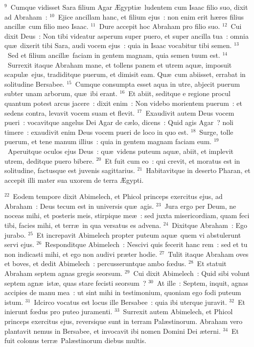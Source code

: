 ${}^{9}$~Cumque vidisset Sara filium Agar \AE gypti\ae\ ludentem cum Isaac filio suo, dixit ad Abraham~:
${}^{10}$~Ejice ancillam hanc, et filium ejus~: non enim erit h\ae res filius ancill\ae\ cum filio meo Isaac.
${}^{11}$~Dure accepit hoc Abraham pro filio suo.
${}^{12}$~Cui dixit Deus~: Non tibi videatur asperum super puero, et super ancilla tua~: omnia qu\ae\ dixerit tibi Sara, audi vocem ejus~: quia in Isaac vocabitur tibi semen.
${}^{13}$~Sed et filium ancill\ae\ faciam in gentem magnam, quia semen tuum est.
${}^{14}$~Surrexit itaque Abraham mane, et tollens panem et utrem aqu\ae , imposuit scapul\ae\ ejus, tradiditque puerum, et dimisit eam. Qu\ae\ cum abiisset, errabat in solitudine Bersabee.
${}^{15}$~Cumque consumpta esset aqua in utre, abjecit puerum subter unam arborum, qu\ae\ ibi erant.
${}^{16}$~Et abiit, seditque e regione procul quantum potest arcus jacere~: dixit enim~: Non videbo morientem puerum~: et sedens contra, levavit vocem suam et flevit.
${}^{17}$~Exaudivit autem Deus vocem pueri~: vocavitque angelus Dei Agar de c\ae lo, dicens~: Quid agis Agar~? noli timere~: exaudivit enim Deus vocem pueri de loco in quo est.
${}^{18}$~Surge, tolle puerum, et tene manum illius~: quia in gentem magnam faciam eum.
${}^{19}$~Aperuitque oculos ejus Deus~: qu\ae\ videns puteum aqu\ae , abiit, et implevit utrem, deditque puero bibere.
${}^{20}$~Et fuit cum eo~: qui crevit, et moratus est in solitudine, factusque est juvenis sagittarius.
${}^{21}$~Habitavitque in deserto Pharan, et accepit illi mater sua uxorem de terra \AE gypti.


${}^{22}$~Eodem tempore dixit Abimelech, et Phicol princeps exercitus ejus, ad Abraham~: Deus tecum est in universis qu\ae\ agis.
${}^{23}$~Jura ergo per Deum, ne noceas mihi, et posteris meis, stirpique me\ae~: sed juxta misericordiam, quam feci tibi, facies mihi, et terr\ae\ in qua versatus es advena.
${}^{24}$~Dixitque Abraham~: Ego jurabo.
${}^{25}$~Et increpavit Abimelech propter puteum aqu\ae\ quem vi abstulerunt servi ejus.
${}^{26}$~Responditque Abimelech~: Nescivi quis fecerit hanc rem~: sed et tu non indicasti mihi, et ego non audivi pr\ae ter hodie.
${}^{27}$~Tulit itaque Abraham oves et boves, et dedit Abimelech~: percusseruntque ambo fœdus.
${}^{28}$~Et statuit Abraham septem agnas gregis seorsum.
${}^{29}$~Cui dixit Abimelech~: Quid sibi volunt septem agn\ae\ ist\ae , quas stare fecisti seorsum~?
${}^{30}$~At ille~: Septem, inquit, agnas accipies de manu mea~: ut sint mihi in testimonium, quoniam ego fodi puteum istum.
${}^{31}$~Idcirco vocatus est locus ille Bersabee~: quia ibi uterque juravit.
${}^{32}$~Et inierunt fœdus pro puteo juramenti.
${}^{33}$~Surrexit autem Abimelech, et Phicol princeps exercitus ejus, reversique sunt in terram Pal\ae stinorum. Abraham vero plantavit nemus in Bersabee, et invocavit ibi nomen Domini Dei \ae terni.
${}^{34}$~Et fuit colonus terr\ae\ Pal\ae stinorum diebus multis.

